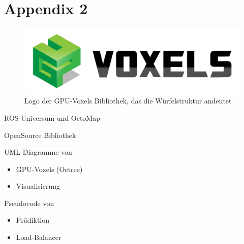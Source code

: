 \chapter{Appendix 2}
\label{chap:appendix_gpu_voxels}

\begin{figure}[hbtp]
\centering
\includegraphics[scale=1]{04_images/gpu_voxels_logo_small.png}
\caption{Logo der GPU-Voxels Bibliothek, das die Würfelstruktur andeutet}
\label{fig:gpu_voxels_logo}
\end{figure}

ROS Universum und OctoMap

OpenSource Bibliothek

UML Diagramme von
\begin{itemize}
\item GPU-Voxels (Octree)
\item Visualisierung
\end{itemize}

Pseudocode von
\begin{itemize}
\item Prädiktion
\item Load-Balancer
\end{itemize}
